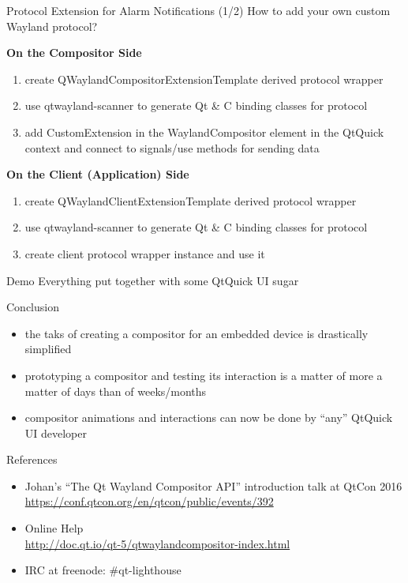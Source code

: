 \documentclass[ucs,9pt]{beamer}
\begin{document}
\begin{frame}[fragile]
    {Protocol Extension for Alarm Notifications (1/2)}
    {How to add your own custom Wayland protocol?}

    \textbf{On the Compositor Side}
    \begin{enumerate}
        \item create QWaylandCompositorExtensionTemplate derived protocol wrapper
        \item use qtwayland-scanner to generate Qt \& C binding classes for protocol
        \item add CustomExtension in the WaylandCompositor element in the QtQuick context and connect to signals/use methods for sending data
    \end{enumerate}
    \medskip

    \textbf{On the Client (Application) Side}
    \begin{enumerate}
        \item create QWaylandClientExtensionTemplate derived protocol wrapper
        \item use qtwayland-scanner to generate Qt \& C binding classes for protocol
        \item create client protocol wrapper instance and use it
    \end{enumerate}

\end{frame}

\begin{frame}
    {Demo}
    {Everything put together with some QtQuick UI sugar}
\end{frame}

\begin{frame}
    {Conclusion}

    \begin{itemize}
        \item the taks of creating a compositor for an embedded device is drastically simplified
        \item prototyping a compositor and testing its interaction is a matter of more a matter of days than of weeks/months
        \item compositor animations and interactions can now be done by ``any'' QtQuick UI developer
    \end{itemize}
\end{frame}

\begin{frame}
    {References}

    \begin{itemize}
        \item Johan's ``The Qt Wayland Compositor API'' introduction talk at QtCon 2016\\
            \url{https://conf.qtcon.org/en/qtcon/public/events/392}
        \item Online Help\\
            \url{http://doc.qt.io/qt-5/qtwaylandcompositor-index.html}
        \item IRC at freenode: \#qt-lighthouse
    \end{itemize}
\end{frame}

\KDElastframe
\end{document}
